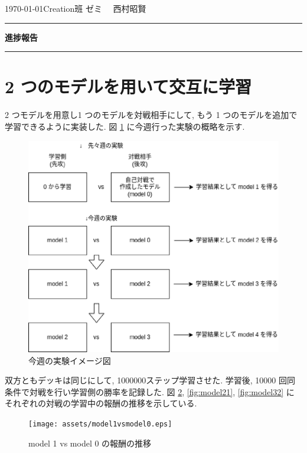\documentclass{jarticle}     %
\begin{document}
  \noindent
  \hspace{1em}

  \today Creation班 ゼミ
  \hfill
  \ \  西村昭賢 

  \vspace{2mm}
  \hrule
  \begin{center}
  {\Large \bf 進捗報告}
  \end{center}
  \hrule
  \vspace{3mm}


\section{2 つのモデルを用いて交互に学習}
2 つモデルを用意し1 つのモデルを対戦相手にして, もう 1 つのモデルを追加で学習できるように実装した.
図 \ref{fig:jikkenimage} に今週行った実験の概略を示す.
\begin{figure}[ht]
  \centering
  \includegraphics[width=120mm]{assets/jikkenimage.eps}
  \vspace{-0.3cm}
  \caption{今週の実験イメージ図}
  \label{fig:jikkenimage}
\end{figure}

双方ともデッキは同じにして, 1000000ステップ学習させた. 学習後, 10000 回同条件で対戦を行い学習側の勝率を記録した.
図 \ref{fig:model10}, \ref{fig:model21}, \ref{fig:model32} にそれぞれの対戦の学習中の報酬の推移を示している.
\begin{figure}[ht]
  \centering
  \texttt{[image: assets/model1vsmodel0.eps]}
  \vspace{-0.3cm}
  \caption{model 1 vs model 0 の報酬の推移}
  \label{fig:model10}
\end{figure}
\end{document}
